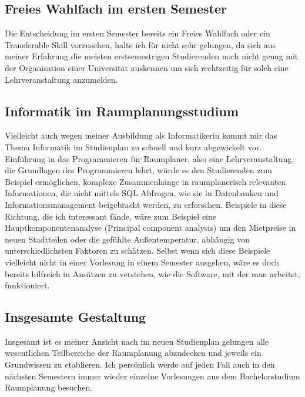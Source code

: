 \documentclass[]{article}
\begin{document}
\subsection{Freies Wahlfach im ersten Semester}
Die Entscheidung im ersten Semester bereits ein Freies Wahlfach oder ein Transferable Skill vorzusehen, halte ich für nicht sehr gelungen, da sich aus meiner Erfahrung die meisten erstsemestrigen Studierenden noch nicht genug mit der Organisation einer Universität auskennen um sich rechtzeitig für solch eine Lehrveranstaltung anzumelden.

\subsection{Informatik im Raumplanungsstudium}
Vielleicht auch wegen meiner Ausbildung als Informatikerin kommt mir das Thema Informatik im Studienplan zu schnell und kurz abgewickelt vor. Einführung in das Programmieren für Raumplaner, also eine Lehrveranstaltung, die Grundlagen des Programmieren lehrt, würde es den Studierenden zum Beispiel ermöglichen, komplexe Zusammenhänge in raumplanerisch relevanten Informationen, die nicht mittels SQL Abfragen, wie sie in Datenbanken und Informationsmanagement beigebracht werden, zu erforschen. Beispiele in diese Richtung, die ich interessant fände, wäre zum Beispiel eine Hauptkomponentenanalyse (Principal component analysis) um den Mietpreise in neuen Stadtteilen oder die gefühlte Außentemperatur, abhängig von unterschiedlichsten Faktoren zu schätzen. Selbst wenn sich diese Beispiele vielleicht nicht in einer Vorlesung in einem Semester ausgehen, wäre es doch bereits hilfreich in Ansätzen zu verstehen, wie die Software, mit der man arbeitet, funktioniert.

\subsection{Insgesamte Gestaltung}
Insgesamt ist es meiner Ansicht nach im neuen Studienplan gelungen alle wesentlichen Teilbereiche der Raumplanung abzudecken und jeweils ein Grundwissen zu etablieren. Ich persönlich werde auf jeden Fall auch in den nächsten Semestern immer wieder einzelne Vorlesungen aus dem Bachelorstudium Raumplanung besuchen.
\end{document}
